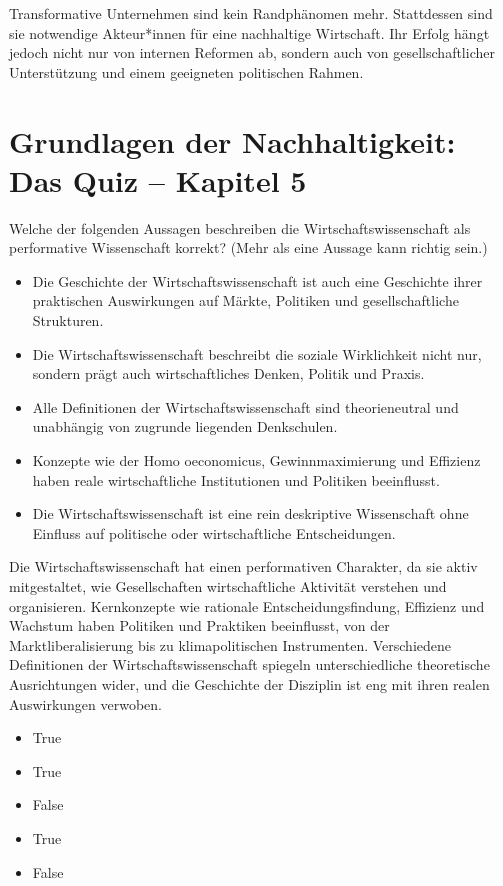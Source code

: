 \documentclass[
  nswissgerman,
  a4paper,
  DIV=11,
  numbers=noendperiod,
  oneside,
  openany]{scrreprt}
\providecommand{\tightlist}{%
  \setlength{\itemsep}{0pt}\setlength{\parskip}{0pt}}
\begin{document}
Transformative Unternehmen sind kein Randphänomen mehr. Stattdessen sind
sie notwendige Akteur*innen für eine nachhaltige Wirtschaft. Ihr Erfolg
hängt jedoch nicht nur von internen Reformen ab, sondern auch von
gesellschaftlicher Unterstützung und einem geeigneten politischen
Rahmen.

\section{Grundlagen der Nachhaltigkeit: Das Quiz -- Kapitel
5}\label{grundlagen-der-nachhaltigkeit-das-quiz-kapitel-5}

Welche der folgenden Aussagen beschreiben die Wirtschaftswissenschaft
als performative Wissenschaft korrekt? (Mehr als eine Aussage kann
richtig sein.)

\begin{itemize}
\tightlist
\item[$\square$]
  Die Geschichte der Wirtschaftswissenschaft ist auch eine Geschichte
  ihrer praktischen Auswirkungen auf Märkte, Politiken und
  gesellschaftliche Strukturen.
\item[$\square$]
  Die Wirtschaftswissenschaft beschreibt die soziale Wirklichkeit nicht
  nur, sondern prägt auch wirtschaftliches Denken, Politik und Praxis.
\item[$\square$]
  Alle Definitionen der Wirtschaftswissenschaft sind theorieneutral und
  unabhängig von zugrunde liegenden Denkschulen.
\item[$\square$]
  Konzepte wie der Homo oeconomicus, Gewinnmaximierung und Effizienz
  haben reale wirtschaftliche Institutionen und Politiken beeinflusst.
\item[$\square$]
  Die Wirtschaftswissenschaft ist eine rein deskriptive Wissenschaft
  ohne Einfluss auf politische oder wirtschaftliche Entscheidungen.
\end{itemize}

Die Wirtschaftswissenschaft hat einen performativen Charakter, da sie
aktiv mitgestaltet, wie Gesellschaften wirtschaftliche Aktivität
verstehen und organisieren. Kernkonzepte wie rationale
Entscheidungsfindung, Effizienz und Wachstum haben Politiken und
Praktiken beeinflusst, von der Marktliberalisierung bis zu
klimapolitischen Instrumenten. Verschiedene Definitionen der
Wirtschaftswissenschaft spiegeln unterschiedliche theoretische
Ausrichtungen wider, und die Geschichte der Disziplin ist eng mit ihren
realen Auswirkungen verwoben.

\begin{itemize}
\tightlist
\item
  True
\item
  True
\item
  False
\item
  True
\item
  False
\end{itemize}
\end{document}
